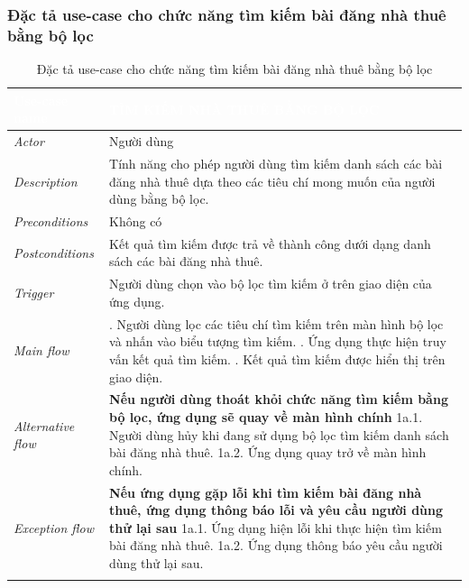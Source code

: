 \subsubsection{Đặc tả use-case cho chức năng tìm kiếm bài đăng nhà thuê bằng bộ lọc}
\begin{center}
    \arrayrulewidth=2pt
    \begin{longtable}{
        |>{\raggedright\arraybackslash}p{3cm}
        |>{\raggedright\arraybackslash}p{13cm}
        |}
        \hline
        \rowcolor{cyan!75!black} \textcolor{white}{\textbf{Use-case name}} & \textcolor{white}{\textbf{TÌM KIẾM NHÀ THUÊ BẰNG BỘ LỌC}}
        \\\hline
        \rowcolor{cyan!10!white} \textit{Actor} & Người dùng
        \\\hdashline
        \rowcolor{cyan!10!white} \textit{Description} & Tính năng cho phép người dùng tìm kiếm danh sách các bài đăng nhà thuê dựa theo các tiêu chí mong muốn của người dùng bằng bộ lọc.
        \\\hdashline
        \rowcolor{cyan!10!white} \textit{Preconditions} & Không có
        \\\hdashline
        \rowcolor{cyan!10!white} \textit{Postconditions} & Kết quả tìm kiếm được trả về thành công dưới dạng danh sách các bài đăng nhà thuê.
        \\\hdashline
        \rowcolor{cyan!10!white} \textit{Trigger} & Người dùng chọn vào bộ lọc tìm kiếm ở trên giao diện của ứng dụng.
        \\\hdashline
        \rowcolor{cyan!10!white} \textit{Main flow} &
        1. Người dùng lọc các tiêu chí tìm kiếm trên màn hình bộ lọc và nhấn vào biểu tượng tìm kiếm. \newline
        2. Ứng dụng thực hiện truy vấn kết quả tìm kiếm. \newline
        3. Kết quả tìm kiếm được hiển thị trên giao diện.
        \\\hdashline
        \rowcolor{cyan!10!white} \textit{Alternative flow} & 
         \textbf{Nếu người dùng thoát khỏi chức năng tìm kiếm bằng bộ lọc, ứng dụng sẽ quay về màn hình chính} 
        1a.1. Người dùng hủy khi đang sử dụng bộ lọc tìm kiếm danh sách bài đăng nhà thuê. \newline
        1a.2. Ứng dụng quay trở về màn hình chính.
        \\\hdashline
        \rowcolor{cyan!10!white} \textit{Exception flow} &
        \textbf{Nếu ứng dụng gặp lỗi khi tìm kiếm bài đăng nhà thuê, ứng dụng thông báo lỗi và yêu cầu người dùng thử lại sau} \newline
        1a.1. Ứng dụng hiện lỗi khi thực hiện tìm kiếm bài đăng nhà thuê. \newline
        1a.2. Ứng dụng thông báo yêu cầu người dùng thử lại sau.
        \\\hline
        \caption{Đặc tả use-case cho chức năng tìm kiếm bài đăng nhà thuê bằng bộ lọc}
    \end{longtable}
\end{center}

